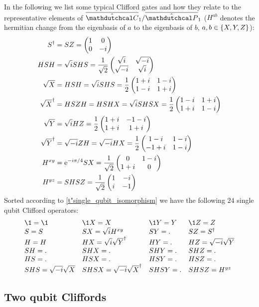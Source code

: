 \documentclass[a4paper,english]{scrartcl}
\begin{document}
\begin{remark}
In the following we list some typical Clifford gates and how they relate to the
representative elements of $\ouic_1/\ouip_1$ ($H^{ab}$ denotes the hermitian change from
the eigenbasis of $a$ to the eigenbasis of $b$, $a, b \in \bc{X, Y, Z}$):
\begin{align}
  S^\dagger &= SZ = \begin{pmatrix}1&0\\0&-i\end{pmatrix}\\
  HSH &= \sqrt{i}SHS = \frac{1}{\sqrt{2}}\begin{pmatrix}\sqrt{i}&\sqrt{-i}\\\sqrt{-i}&\sqrt{i}\end{pmatrix}\\
  \sqrt{X} &= HSH = \sqrt{i}SHS = \frac{1}{2}\begin{pmatrix}1+i&1-i\\1-i&1+i\end{pmatrix}\\
  \sqrt{X}^\dagger &= HSZH = HSHX = \sqrt{i}SHSX = \frac{1}{2}\begin{pmatrix}1-i&1+i\\1+i&1-i\end{pmatrix}\\
  \sqrt{Y} &= \sqrt{i}HZ = \frac{1}{2}\begin{pmatrix}1+i&-1-i\\1+i&1+i\end{pmatrix}\\
  \sqrt{Y}^\dagger &= \sqrt{-i}ZH = \sqrt{-i}HX = \frac{1}{2}\begin{pmatrix}1-i&1-i\\-1+i&1-i\end{pmatrix}\\
  H^{xy} &= \mathrm{e}^{-i\pi/4}SX = \frac{1}{\sqrt{2}}\begin{pmatrix}0&1-i\\1+i&0\end{pmatrix}\\
  H^{yz} &= SHSZ = \frac{1}{\sqrt{2}}\begin{pmatrix}1&-i\\i&-1\end{pmatrix}\\
\end{align}
Sorted according to \cref{t"single_qubit_isomorphism} we have the following $24$
single qubit Clifford operators:
\begin{align}
  \begin{array}{llll}
    \1 = \1 & \1X = X & \1Y = Y & \1Z = Z\\
    S = S & SX = \sqrt{i}H^{xy} & SY = . & SZ = S\ur\\
    H = H & HX =\sqrt{i}\sqrt{Y}\ur & HY = . & HZ = \sqrt{-i}\sqrt{Y}\\
    SH = . & SHX = . & SHY = . & SHZ = .\\
    HS = . & HSX = . & HSY = . & HSZ = .\\
    SHS = \sqrt{-i}\sqrt{X} & SHSX = \sqrt{-i}\sqrt{X}\ur & SHSY = . & SHSZ = H^{yz}
  \end{array}
\end{align}
\end{remark}

\subsection{Two qubit Cliffords}
\end{document}
